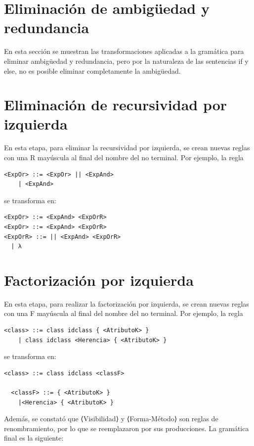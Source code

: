 \section{Eliminación de ambigüedad y redundancia}
\label{sec:eliminacion-ambiguedad}
En esta sección se muestran las transformaciones aplicadas a la gramática para eliminar ambigüedad y redundancia,
pero por la naturaleza de las sentencias if y else, no es posible eliminar completamente la ambigüedad.


\section{Eliminación de recursividad por izquierda}
En esta etapa, para eliminar la recursividad por izquierda, se crean nuevas reglas con una R mayúscula al final del nombre del no terminal. Por ejemplo, la regla
\begin{lstlisting}[style=bnftinys]
  <ExpOr> ::= <ExpOr> || <ExpAnd>
    | <ExpAnd>
\end{lstlisting}
se transforma en:
\begin{lstlisting}[style=bnftinys]<ExpOr> ::= <ExpAnd> <ExpOrR>
<ExpOr> ::= <ExpAnd> <ExpOrR>
<ExpOrR> ::= || <ExpAnd> <ExpOrR>
  | λ
\end{lstlisting}


\section{Factorización por izquierda}
En esta etapa, para realizar la factorización por izquierda, se crean nuevas reglas con una F mayúscula al final del nombre del no terminal. Por ejemplo, la regla
\begin{lstlisting}[style=bnftinys]
  <class> ::= class idclass { <AtributoK> }
    | class idclass <Herencia> { <AtributoK> }
\end{lstlisting}
se transforma en:
\begin{lstlisting}[style=bnftinys]
  <class> ::= class idclass <classF>

  <classF> ::= { <AtributoK> }
    |<Herencia> { <AtributoK> }
\end{lstlisting}
Además, se constató que ⟨Visibilidad⟩ y ⟨Forma-Método⟩ son reglas de renombramiento, por lo que se reemplazaron por sus producciones. La gramática final es la siguiente:



